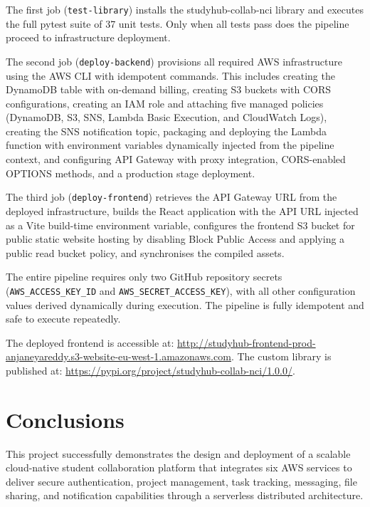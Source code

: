 \documentclass[conference]{IEEEtran}
\begin{document}
The first job (\texttt{test-library}) installs the studyhub-collab-nci library and executes the full pytest suite of 37 unit tests. Only when all tests pass does the pipeline proceed to infrastructure deployment.

The second job (\texttt{deploy-backend}) provisions all required AWS infrastructure using the AWS CLI with idempotent commands. This includes creating the DynamoDB table with on-demand billing, creating S3 buckets with CORS configurations, creating an IAM role and attaching five managed policies (DynamoDB, S3, SNS, Lambda Basic Execution, and CloudWatch Logs), creating the SNS notification topic, packaging and deploying the Lambda function with environment variables dynamically injected from the pipeline context, and configuring API Gateway with proxy integration, CORS-enabled OPTIONS methods, and a production stage deployment.

The third job (\texttt{deploy-frontend}) retrieves the API Gateway URL from the deployed infrastructure, builds the React application with the API URL injected as a Vite build-time environment variable, configures the frontend S3 bucket for public static website hosting by disabling Block Public Access and applying a public read bucket policy, and synchronises the compiled assets.

The entire pipeline requires only two GitHub repository secrets (\texttt{AWS\_ACCESS\_KEY\_ID} and \texttt{AWS\_SECRET\_ACCESS\_KEY}), with all other configuration values derived dynamically during execution. The pipeline is fully idempotent and safe to execute repeatedly.

The deployed frontend is accessible at: \url{http://studyhub-frontend-prod-anjaneyareddy.s3-website-eu-west-1.amazonaws.com}. The custom library is published at: \url{https://pypi.org/project/studyhub-collab-nci/1.0.0/}.

\section{Conclusions}

This project successfully demonstrates the design and deployment of a scalable cloud-native student collaboration platform that integrates six AWS services to deliver secure authentication, project management, task tracking, messaging, file sharing, and notification capabilities through a serverless distributed architecture.
\end{document}
